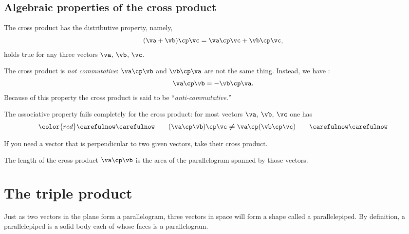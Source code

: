 \subsection{Algebraic properties of the cross product}
The cross product has the distributive property, namely,
\begin{equation}
  (\va+\vb)\cp\vc  = \va\cp\vc + \vb\cp\vc,
  \label{eq:cross-product-distributive}
\end{equation}
holds true for any three vectors $\va$, $\vb$, $\vc$.

The cross product is \emph{not commutative}: $\va\cp\vb$ and
$\vb\cp\va$ are not the same thing.  Instead, we have :
\begin{equation}
  \va\cp\vb = -\vb\cp\va.
\end{equation}
Because of this property the cross product is said to be
``\textit{anti-commutative.}''

The associative property fails completely for the cross product: for
most vectors $\va$, $\vb$, $\vc$ one has
\begin{equation}\color{red}
  \carefulnow\carefulnow\qquad
  (\va\cp\vb)\cp\vc\; {\boldsymbol \neq}\; \va\cp(\vb\cp\vc)
  \qquad \carefulnow\carefulnow
  \label{eq:cross-product-not-associative}
\end{equation}

If you need a vector that is perpendicular to two given vectors, take
their cross product.

The length of the cross product $\va\cp\vb$ is the area of the
parallelogram spanned by those vectors.

\section{The triple product} %
\label{sec:determ-triple-prod}
Just as two vectors in the plane form a parallelogram, three vectors
in space will form a shape called a parallelepiped.  By definition, a
parallelepiped is a solid body each of whose faces is a parallelogram.

